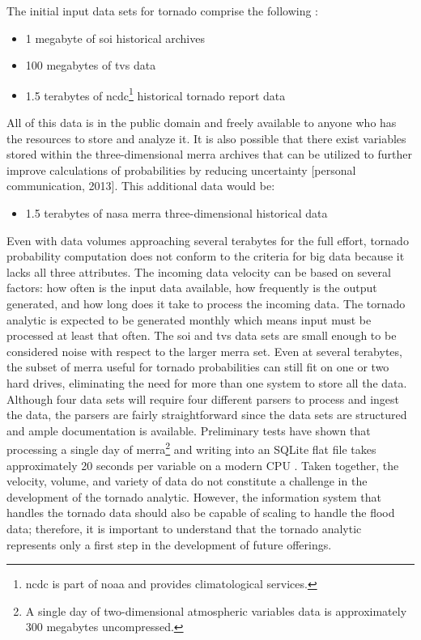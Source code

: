 The initial input data sets for tornado comprise the following \cite{walker}:
\begin{itemize}
    \item 1 megabyte of \gls{soi} historical archives \cite{bom}
    \item 100 megabytes of \gls{tvs} data \cite{hdss}
    \item 1.5 terabytes of \gls{ncdc}\footnote{\gls{ncdc} is part of \gls{noaa} and provides climatological services.} historical tornado report data \cite{ncdc}
\end{itemize}
All of this data is in the public domain and freely available to anyone who has the resources to store and analyze it. It is also possible that there exist variables stored within the three-dimensional \gls{merra} archives that can be utilized to further improve calculations of probabilities by reducing uncertainty [personal communication, 2013]. This additional data would be:
\begin{itemize}
    \item 1.5 terabytes of \gls{nasa} \gls{merra} three-dimensional historical data \cite{mdisc}
\end{itemize}
Even with data volumes approaching several terabytes for the full effort, tornado probability computation does not conform to the criteria for big data because it lacks all three attributes. The incoming data velocity can be based on several factors: how often is the input data available, how frequently is the output generated, and how long does it take to process the incoming data. The tornado analytic is expected to be generated monthly which means input must be processed at least that often. The \gls{soi} and \gls{tvs} data sets are small enough to be considered noise with respect to the larger \gls{merra} set. Even at several terabytes, the subset of \gls{merra} useful for tornado probabilities can still fit on one or two hard drives, eliminating the need for more than one system to store all the data.  Although four data sets will require four different parsers to process and ingest the data, the parsers are fairly straightforward since the data sets are structured and ample documentation is available. Preliminary tests have shown that processing a single day of \gls{merra}\footnote{A single day of two-dimensional atmospheric variables data is approximately 300 megabytes uncompressed.} and writing into an SQLite flat file takes approximately 20 seconds per variable on a modern CPU \cite{keller1}. Taken together, the velocity, volume, and variety of data do not constitute a challenge in the development of the tornado analytic. However, the information system that handles the tornado data should also be capable of scaling to handle the flood data; therefore, it is important to understand that the tornado analytic represents only a first step in the development of future offerings.\\

